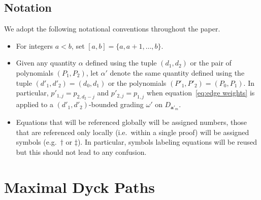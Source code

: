 \documentclass[10pt]{amsart}
\theoremstyle{definition}
\newcommand{\ie}{i.e.\ }
\newcommand{\bfa}{\mathbf{a}}
\begin{document}
 \subsection*{Notation}
 We adopt the following notational conventions throughout the paper.
 \begin{itemize}
 \item For integers $a<b$, set $[a,b]=\{a,a+1,\ldots,b\}$.
 \item Given any quantity $\alpha$ defined using the tuple $(d_1,d_2)$ or the pair of polynomials $(P_1,P_2)$, let $\alpha'$ denote the same quantity defined using the tuple $(d'_1,d'_2)=(d_0,d_1)$ or the polynomials $(P'_1,P'_2)=(P_0,P_1)$. 
 In particular, $p'_{1,j}=p_{2,d_2-j}$ and $p'_{2,j}=p_{1,j}$ when equation~\eqref{eq:edge weights} is applied to a $(d'_1,d'_2)$-bounded grading $\omega'$ on $D_{\bfa'_m}$.
 \item Equations that will be referenced globally will be assigned numbers, those that are referenced only locally (\ie within a single proof) will be assigned symbols (e.g.\ $\dagger$ or $\ddagger$). 
 In particular, symbols labeling equations will be reused but this should not lead to any confusion. 
 \end{itemize}


\section{Maximal Dyck Paths}
\label{sec:dyck paths}
\end{document}
